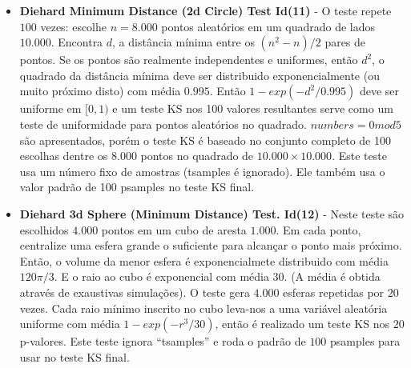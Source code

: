 \begin{itemize}
   \item \textbf{Diehard Minimum Distance (2d Circle) Test Id(11)} - O teste repete $100$ vezes: escolhe $n=8.000$ pontos aleatórios em um quadrado de lados $10.000$. Encontra $d$, a distância mínima entre os $(n^2-n)/2$ pares de pontos. Se os pontos são realmente independentes e uniformes, então $d^2$, o quadrado da distância mínima deve ser distribuido exponencialmente (ou muito próximo disto) com média $0.995$. Então $1-exp(-d^2/0.995)$ deve ser uniforme em $[0,1)$ e um teste KS nos 100 valores resultantes serve como um teste de uniformidade para pontos aleatórios no quadrado. $numbers=0 mod 5$ são apresentados, porém o teste KS é baseado no conjunto completo de 100 escolhas dentre os $8.000$ pontos no  quadrado de $10.000 \times 10.000$. Este teste usa um número fixo de amostras (tsamples é ignorado). Ele também usa o valor padrão de 100 psamples no teste KS final.
   
   \item \textbf{Diehard 3d Sphere (Minimum Distance) Test. Id(12)} - Neste teste são escolhidos $4.000$ pontos em um cubo de aresta $1.000$. Em cada ponto, centralize uma esfera grande o suficiente para alcançar o ponto mais próximo. Então, o volume da menor esfera é exponencialmete distribuido com média $120\pi/3$. E o raio ao cubo é exponencial com média 30. (A média é obtida através de exaustivas simulações). O teste gera $4.000$ esferas repetidas por $20$ vezes. Cada raio mínimo inscrito no cubo leva-nos a uma variável aleatória uniforme com média $1-exp(-r^3/30)$, então é realizado um teste KS nos $20$ p-valores. Este teste ignora ``tsamples'' e roda o padrão de $100$ psamples para usar no teste KS final. 
   

\end{itemize}
